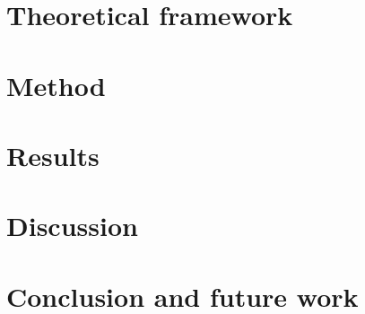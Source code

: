 \documentclass[a4paper,oneside]{bth}
\begin{document}
\chapter{Theoretical framework}


\chapter{Method}


\chapter{Results}


\chapter{Discussion}


\chapter{Conclusion and future work}




\end{document}
